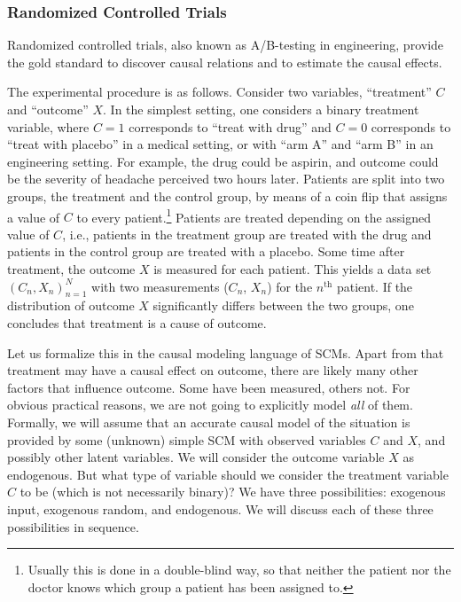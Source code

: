 \subsubsection{Randomized Controlled Trials}

Randomized controlled trials, also known as A/B-testing in engineering, provide the 
gold standard to discover causal relations and to estimate the causal effects.

The experimental procedure is as follows.
Consider two variables, ``treatment'' $C$ and ``outcome'' $X$. 
In the simplest setting, one considers a 
binary treatment variable, where $C=1$ corresponds to ``treat with drug'' and
$C=0$ corresponds to ``treat with placebo'' in a medical setting, or with ``arm A''
and ``arm B'' in an engineering setting. For example, the drug could be aspirin,
and outcome could be the severity of headache perceived two
hours later. Patients are split into two groups,
the treatment and the control group, by means of a coin flip that assigns a value
of $C$ to every patient.\footnote{Usually this is done in a double-blind way, so
that neither the patient nor the doctor knows which group a patient has been assigned
to.} Patients are treated depending on the assigned value of $C$, i.e., patients in the
treatment group are treated with the drug and patients in the control group are treated
with a placebo. Some time after treatment, the outcome $X$ is measured for each patient. 
This yields a data set $(C_n,X_n)_{n=1}^N$
with two measurements ($C_n$, $X_n$) for the $n^{\mathrm{th}}$ patient. 
If the distribution of outcome $X$ significantly differs between the two groups,
one concludes that treatment is a cause of outcome. 

Let us formalize this in the causal modeling language of SCMs.
Apart from that treatment may have a causal 
effect on outcome, there are likely many other factors that influence outcome. Some
have been measured, others not. For obvious practical reasons, we are not going 
to explicitly model \emph{all} of them. Formally, we will assume that an accurate
causal model of the situation is provided by some (unknown) simple SCM with observed
variables $C$ and $X$, and possibly other latent variables.
We will consider the outcome variable $X$ as endogenous. 
But what type of variable should we consider
the treatment variable $C$ to be (which is not necessarily binary)?
We have three possibilities: exogenous input, exogenous random, and endogenous. We will
discuss each of these three possibilities in sequence.

